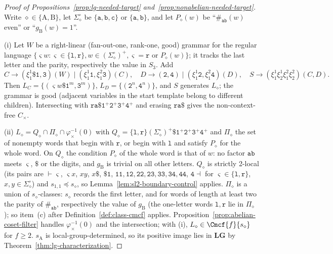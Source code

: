 \begin{proof}[Proof of Propositions~\ref{prop:lg-needed-target}
and~\ref{prop:nonabelian-needed-target}]
Write $\diamond\in\{\mathrm A,\mathrm B\}$, let $\Sigma_\diamond^\circ$ be $\{\mathtt a,\mathtt b,
\mathtt c\}$ or $\{\mathtt a,\mathtt b\}$, and let $P_\diamond(w)$ be ``$\#_{\mathtt{ab}}(w)$
even'' or ``$g_{\mathrm B}(w)=1$''.

(i) Let $W$ be a right-linear (fan-out-one, rank-one, good) grammar for the regular
language $\{\varsigma w:\varsigma\in\{\mathtt l,\mathtt r\},w\in(\Sigma_\diamond^\circ)^+,
\varsigma=\mathtt r\text{ or }P_\diamond(w)\}$; it tracks the last letter and the parity,
respectively the value in $S_3$.  Add
\[
 C\to(\xi_1^1\mathtt\$\mathtt 1,\mathtt 3)(W)\mid(\xi_1^1\mathtt 1,\xi_1^2\mathtt 3)(C),\quad
 D\to(\mathtt 2,\mathtt 4)\mid(\xi_1^1\mathtt 2,\xi_1^2\mathtt 4)(D),\quad
 S\to(\xi_1^1\xi_2^1\xi_1^2\xi_2^2)(C,D).
\]
Then $L_C=\{(\varsigma w\mathtt\$\mathtt 1^m,\mathtt 3^m)\}$, $L_D=\{(\mathtt 2^n,\mathtt 4^n)\}$,
and $S$ generates $L_\diamond$; the grammar is good (adjacent variables in the start
template belong to different children).  Intersecting with
$\mathtt{ra\$}\mathtt 1^+\mathtt 2^+\mathtt 3^+\mathtt 4^+$ and erasing $\mathtt{ra\$}$
gives the non-context-free $C_\times$.

(ii) $L_\diamond=Q_\diamond\cap\Pi_\diamond\cap\varphi_\times^{-1}(0)$ with
$Q_\diamond=\{\mathtt l,\mathtt r\}(\Sigma_\diamond^\circ)^+\mathtt\$\mathtt 1^+\mathtt 2^+\mathtt 3^+
\mathtt 4^+$ and $\Pi_\diamond$ the set of nonempty words that begin with $\mathtt r$, or begin
with $\mathtt l$ and satisfy $P_\diamond$ for the whole word.  On $Q_\diamond$ the condition $P_\diamond$ of
the whole word is that of $w$: no factor $\mathtt{ab}$ meets $\varsigma$, $\mathtt\$$ or
the digits, and $g_{\mathrm B}$ is trivial on all other letters.  $Q_\diamond$ is strictly
2-local (its pairs are $\vdash\varsigma$, $\varsigma x$, $xy$, $x\mathtt\$$, $\mathtt{\$1}$,
$\mathtt{11},\mathtt{12},\mathtt{22},\mathtt{23},\mathtt{33},\mathtt{34},\mathtt{44}$,
$\mathtt 4\dashv$ for $\varsigma\in\{\mathtt l,\mathtt r\}$, $x,y\in\Sigma_\diamond^\circ$) and
$s_{1,1}\preceq s_\diamond$, so Lemma~\ref{lem:sl2-boundary-control} applies.  $\Pi_\diamond$ is a
union of $s_\diamond$-classes: $s_\diamond$ records the first letter, and for words of length at least
two the parity of $\#_{\mathtt{ab}}$, respectively the value of $g_{\mathrm B}$ (the
one-letter words $\mathtt l,\mathtt r$ lie in $\Pi_\diamond$); so item~(c) after
Definition~\ref{def:class-cmcf} applies.  Proposition~\ref{prop:abelian-coset-filter}
handles $\varphi_\times^{-1}(0)$ and the intersection; with (i),
$L_\diamond\in\Cmcf{f}{s_\diamond}$ for $f\ge2$.  $s_{\mathrm A}$ is local-group-determined, so its
positive image lies in $\mathbf{LG}$ by Theorem~\ref{thm:lg-characterization}.


\end{proof}
